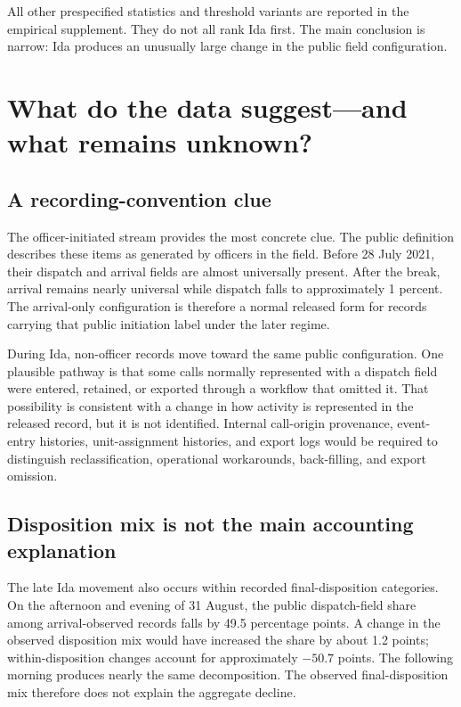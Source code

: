 \documentclass[11pt]{article}
\begin{document}
All other prespecified statistics and threshold variants are reported in the empirical supplement. They do not all rank Ida first. The main conclusion is narrow: Ida produces an unusually large change in the public field configuration.

\section{What do the data suggest---and what remains unknown?}

\subsection{A recording-convention clue}

The officer-initiated stream provides the most concrete clue. The public definition describes these items as generated by officers in the field. Before 28 July 2021, their dispatch and arrival fields are almost universally present. After the break, arrival remains nearly universal while dispatch falls to approximately 1 percent. The arrival-only configuration is therefore a normal released form for records carrying that public initiation label under the later regime.

During Ida, non-officer records move toward the same public configuration. One plausible pathway is that some calls normally represented with a dispatch field were entered, retained, or exported through a workflow that omitted it. That possibility is consistent with a change in how activity is represented in the released record, but it is not identified. Internal call-origin provenance, event-entry histories, unit-assignment histories, and export logs would be required to distinguish reclassification, operational workarounds, back-filling, and export omission.

\subsection{Disposition mix is not the main accounting explanation}

The late Ida movement also occurs within recorded final-disposition categories. On the afternoon and evening of 31 August, the public dispatch-field share among arrival-observed records falls by 49.5 percentage points. A change in the observed disposition mix would have increased the share by about 1.2 points; within-disposition changes account for approximately $-50.7$ points. The following morning produces nearly the same decomposition. The observed final-disposition mix therefore does not explain the aggregate decline.
\end{document}

